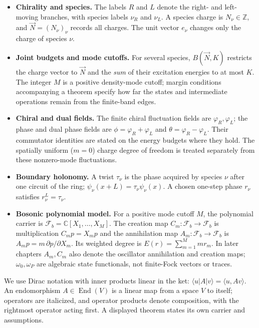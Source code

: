 \begin{itemize}
    \item \textbf{Chirality and species.} The labels $R$ and $L$ denote the
    right- and left-moving branches, with species labels $\nu_R$ and
    $\nu_L$. A species charge is $N_\nu\in\mathbb Z$, and
    $\vec N=(N_\nu)_\nu$ records all charges. The unit vector $e_\nu$
    changes only the charge of species $\nu$.

    \item \textbf{Joint budgets and mode cutoffs.} For several species,
    $B(\vec N,K)$ restricts the charge vector to $\vec N$ and the \emph{sum}
    of their excitation energies to at most $K$. The integer $M$ is a
    positive density-mode cutoff; margin conditions accompanying a theorem
    specify how far the states and intermediate operations remain from the
    finite-band edges.

    \item \textbf{Chiral and dual fields.} The finite chiral fluctuation
    fields are $\varphi_R,\varphi_L$; the phase and dual phase fields are
    $\phi=\varphi_R+\varphi_L$ and $\theta=\varphi_R-\varphi_L$. Their
    commutator identities are stated on the energy budgets where they hold.
    The spatially uniform ($m=0$) charge degree of freedom is treated
    separately from these nonzero-mode fluctuations.

    \item \textbf{Boundary holonomy.} A twist $\tau_\nu$ is the phase
    acquired by species $\nu$ after one circuit of the ring;
    $\psi_\nu(x+L)=\tau_\nu\psi_\nu(x)$. A chosen one-step phase $r_\nu$
    satisfies $r_\nu^L=\tau_\nu$.

    \item \textbf{Bosonic polynomial model.} For a positive mode cutoff $M$,
    the polynomial carrier is $\mathcal{F}_b=\mathbb{C}[X_1,\ldots,X_M]$.
    The creation map $C_m:\mathcal{F}_b\to\mathcal{F}_b$ is multiplication
    $C_m p=X_m p$ and the annihilation map $A_m:\mathcal{F}_b\to\mathcal{F}_b$
    is $A_m p=m\,\partial p/\partial X_m$. Its weighted degree is
    $E(r)=\sum_{m=1}^M m r_m$. In later chapters $A_m,C_m$ also denote the
    oscillator annihilation and creation maps; $\omega_0,\omega_P$ are
    algebraic state functionals, not finite-Fock vectors or traces.
\end{itemize}

We use Dirac notation with inner products linear in the ket:
$\langle u|A|v\rangle=\langle u,Av\rangle$. An endomorphism
$A\in\operatorname{End}(V)$ is a linear map from a space $V$ to itself;
operators are italicized, and operator products denote composition, with the
rightmost operator acting first. A displayed theorem states its own carrier
and assumptions.
\endgroup
